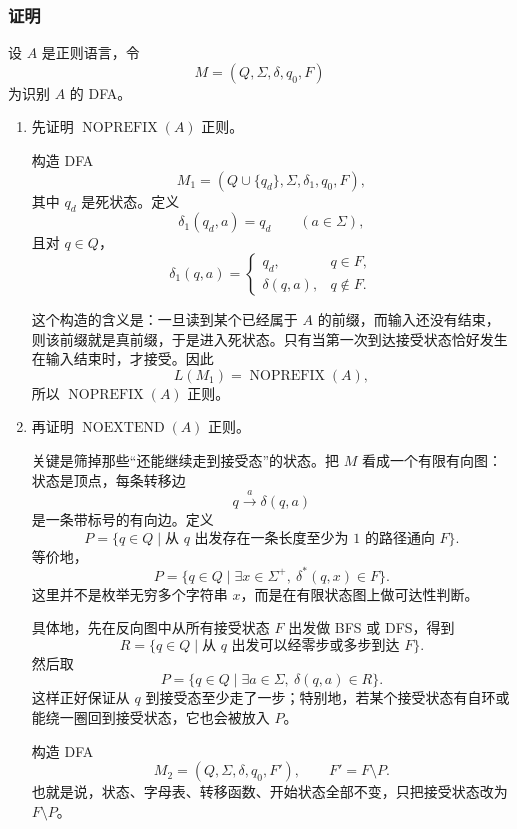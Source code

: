 \begin{answerred}
\subsubsection*{证明}

设 $A$ 是正则语言，令
\[
    M=(Q,\Sigma,\delta,q_0,F)
\]
为识别 $A$ 的 DFA。

\begin{enumerate}[label=(\alph*), leftmargin=2.5em]
    \item 先证明 $\operatorname{NOPREFIX}(A)$ 正则。

    构造 DFA
    \[
        M_1=(Q\cup\{q_d\},\Sigma,\delta_1,q_0,F),
    \]
    其中 $q_d$ 是死状态。定义
    \[
        \delta_1(q_d,a)=q_d
        \qquad(a\in\Sigma),
    \]
    且对 $q\in Q$，
    \[
        \delta_1(q,a)=
        \begin{cases}
            q_d, & q\in F,\\
            \delta(q,a), & q\notin F.
        \end{cases}
    \]

    这个构造的含义是：一旦读到某个已经属于 $A$ 的前缀，而输入还没有结束，则该前缀就是真前缀，于是进入死状态。只有当第一次到达接受状态恰好发生在输入结束时，才接受。因此
    \[
        L(M_1)=\operatorname{NOPREFIX}(A),
    \]
    所以 $\operatorname{NOPREFIX}(A)$ 正则。

    \item 再证明 $\operatorname{NOEXTEND}(A)$ 正则。

    关键是筛掉那些“还能继续走到接受态”的状态。把 $M$ 看成一个有限有向图：状态是顶点，每条转移边
    \[
        q\xrightarrow{a}\delta(q,a)
    \]
    是一条带标号的有向边。定义
    \[
        P=\{q\in Q\mid \text{从 }q\text{ 出发存在一条长度至少为 }1\text{ 的路径通向 }F\}.
    \]
    等价地，
    \[
        P=\{q\in Q\mid \exists x\in\Sigma^+,\ \delta^*(q,x)\in F\}.
    \]
    这里并不是枚举无穷多个字符串 $x$，而是在有限状态图上做可达性判断。

    具体地，先在反向图中从所有接受状态 $F$ 出发做 BFS 或 DFS，得到
    \[
        R=\{q\in Q\mid \text{从 }q\text{ 出发可以经零步或多步到达 }F\}.
    \]
    然后取
    \[
        P=\{q\in Q\mid \exists a\in\Sigma,\ \delta(q,a)\in R\}.
    \]
    这样正好保证从 $q$ 到接受态至少走了一步；特别地，若某个接受状态有自环或能绕一圈回到接受状态，它也会被放入 $P$。

    构造 DFA
    \[
        M_2=(Q,\Sigma,\delta,q_0,F'),
        \qquad
        F'=F\setminus P.
    \]
    也就是说，状态、字母表、转移函数、开始状态全部不变，只把接受状态改为 $F\setminus P$。


\end{enumerate}
\end{answerred}
